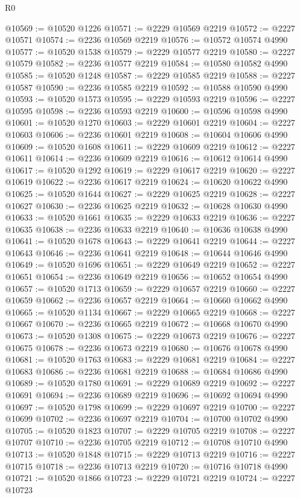 \begin{lexlean}{R0}
\begin{coremodule}
@10569 := @10520 @1226
@10571 := @2229 @10569 @2219
@10572 := @2227 @10571
@10574 := @2236 @10569 @2219
@10576 := @10572 @10574 @4990
@10577 := @10520 @1538
@10579 := @2229 @10577 @2219
@10580 := @2227 @10579
@10582 := @2236 @10577 @2219
@10584 := @10580 @10582 @4990
@10585 := @10520 @1248
@10587 := @2229 @10585 @2219
@10588 := @2227 @10587
@10590 := @2236 @10585 @2219
@10592 := @10588 @10590 @4990
@10593 := @10520 @1573
@10595 := @2229 @10593 @2219
@10596 := @2227 @10595
@10598 := @2236 @10593 @2219
@10600 := @10596 @10598 @4990
@10601 := @10520 @1270
@10603 := @2229 @10601 @2219
@10604 := @2227 @10603
@10606 := @2236 @10601 @2219
@10608 := @10604 @10606 @4990
@10609 := @10520 @1608
@10611 := @2229 @10609 @2219
@10612 := @2227 @10611
@10614 := @2236 @10609 @2219
@10616 := @10612 @10614 @4990
@10617 := @10520 @1292
@10619 := @2229 @10617 @2219
@10620 := @2227 @10619
@10622 := @2236 @10617 @2219
@10624 := @10620 @10622 @4990
@10625 := @10520 @1644
@10627 := @2229 @10625 @2219
@10628 := @2227 @10627
@10630 := @2236 @10625 @2219
@10632 := @10628 @10630 @4990
@10633 := @10520 @1661
@10635 := @2229 @10633 @2219
@10636 := @2227 @10635
@10638 := @2236 @10633 @2219
@10640 := @10636 @10638 @4990
@10641 := @10520 @1678
@10643 := @2229 @10641 @2219
@10644 := @2227 @10643
@10646 := @2236 @10641 @2219
@10648 := @10644 @10646 @4990
@10649 := @10520 @1696
@10651 := @2229 @10649 @2219
@10652 := @2227 @10651
@10654 := @2236 @10649 @2219
@10656 := @10652 @10654 @4990
@10657 := @10520 @1713
@10659 := @2229 @10657 @2219
@10660 := @2227 @10659
@10662 := @2236 @10657 @2219
@10664 := @10660 @10662 @4990
@10665 := @10520 @1134
@10667 := @2229 @10665 @2219
@10668 := @2227 @10667
@10670 := @2236 @10665 @2219
@10672 := @10668 @10670 @4990
@10673 := @10520 @1308
@10675 := @2229 @10673 @2219
@10676 := @2227 @10675
@10678 := @2236 @10673 @2219
@10680 := @10676 @10678 @4990
@10681 := @10520 @1763
@10683 := @2229 @10681 @2219
@10684 := @2227 @10683
@10686 := @2236 @10681 @2219
@10688 := @10684 @10686 @4990
@10689 := @10520 @1780
@10691 := @2229 @10689 @2219
@10692 := @2227 @10691
@10694 := @2236 @10689 @2219
@10696 := @10692 @10694 @4990
@10697 := @10520 @1798
@10699 := @2229 @10697 @2219
@10700 := @2227 @10699
@10702 := @2236 @10697 @2219
@10704 := @10700 @10702 @4990
@10705 := @10520 @1823
@10707 := @2229 @10705 @2219
@10708 := @2227 @10707
@10710 := @2236 @10705 @2219
@10712 := @10708 @10710 @4990
@10713 := @10520 @1848
@10715 := @2229 @10713 @2219
@10716 := @2227 @10715
@10718 := @2236 @10713 @2219
@10720 := @10716 @10718 @4990
@10721 := @10520 @1866
@10723 := @2229 @10721 @2219
@10724 := @2227 @10723

\end{coremodule}
\end{lexlean}

